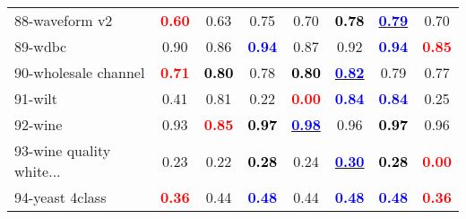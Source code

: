 \begin{table}[h]
\begin{center}
\begin{tabular}{lc|c|c|c|c|c|c}
88-waveform v2 & \textcolor{red}{\textbf{  0.60}} &   0.63 &   0.75 &   0.70 & \textcolor{black}{\textbf{  0.78}} & \underline{\textcolor{blue}{\textbf{  0.79}}} &   0.70 \\
89-wdbc &   0.90 &   0.86 & \textcolor{blue}{\textbf{  0.94}} &   0.87 &   0.92 & \textcolor{blue}{\textbf{  0.94}} & \textcolor{red}{\textbf{  0.85}} \\
90-wholesale channel & \textcolor{red}{\textbf{  0.71}} & \textcolor{black}{\textbf{  0.80}} &   0.78 & \textcolor{black}{\textbf{  0.80}} & \underline{\textcolor{blue}{\textbf{  0.82}}} &   0.79 &   0.77 \\
91-wilt &   0.41 &   0.81 &   0.22 & \textcolor{red}{\textbf{  0.00}} & \textcolor{blue}{\textbf{  0.84}} & \textcolor{blue}{\textbf{  0.84}} &   0.25 \\ \hline
92-wine &   0.93 & \textcolor{red}{\textbf{  0.85}} & \textcolor{black}{\textbf{  0.97}} & \underline{\textcolor{blue}{\textbf{  0.98}}} &   0.96 & \textcolor{black}{\textbf{  0.97}} &   0.96 \\
93-wine quality white... &   0.23 &   0.22 & \textcolor{black}{\textbf{  0.28}} &   0.24 & \underline{\textcolor{blue}{\textbf{  0.30}}} & \textcolor{black}{\textbf{  0.28}} & \textcolor{red}{\textbf{  0.00}} \\
94-yeast 4class & \textcolor{red}{\textbf{  0.36}} &   0.44 & \textcolor{blue}{\textbf{  0.48}} &   0.44 & \textcolor{blue}{\textbf{  0.48}} & \textcolor{blue}{\textbf{  0.48}} & \textcolor{red}{\textbf{  0.36}} \\\end{tabular}\label{tab:balaccClassif2}
\end{center}
\end{table}
